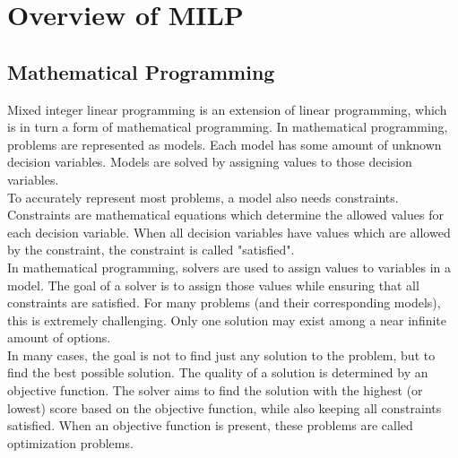 \section{Overview of MILP}
\label{subsec:milp-overview}
\subsection{Mathematical Programming}
Mixed integer linear programming is an extension of linear programming, which is in turn a form of mathematical programming. In mathematical programming, problems are represented as models. Each model has some amount of unknown decision variables. Models are solved by assigning values to those decision variables. \\
To accurately represent most problems, a model also needs constraints. Constraints are mathematical equations which determine the allowed values for each decision variable. When all decision variables have values which are allowed by the constraint, the constraint is called "satisfied". \\
In mathematical programming, solvers are used to assign values to variables in a model. The goal of a solver is to assign those values while ensuring that all constraints are satisfied. For many problems (and their corresponding models), this is extremely challenging. Only one solution may exist among a near infinite amount of options. \\
In many cases, the goal is not to find just any solution to the problem, but to find the best possible solution. The quality of a solution is determined by an objective function. The solver aims to find the solution with the highest (or lowest) score based on the objective function, while also keeping all constraints satisfied. When an objective function is present, these problems are called optimization problems. \\
